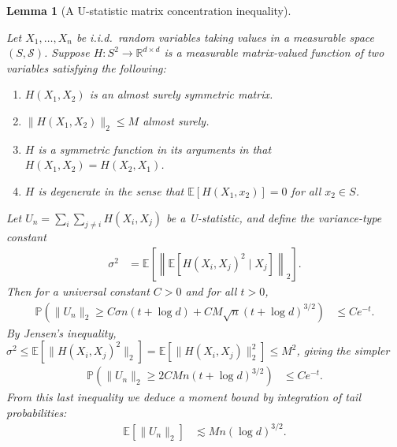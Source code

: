 \documentclass[11pt,lof]{puthesis}
\renewcommand{\P}{\ensuremath{\mathbb{P}}}
\newcommand{\R}{\ensuremath{\mathbb{R}}}
\newcommand{\E}{\ensuremath{\mathbb{E}}}
\newcommand{\cS}{\ensuremath{\mathcal{S}}}
\theoremstyle{break}
\newtheorem{lemma}{Lemma}[section]
\theoremstyle{proof}
\begin{document}
\begin{lemma}[A U-statistic matrix concentration inequality]
  \label{lem:kernel_app_ustat_matrix_concentration}

  Let $X_1, \ldots, X_n$ be i.i.d.\ random variables
  taking values in a measurable space $(S, \cS)$.
  Suppose
  $H: S^2 \to \R^{d \times d}$
  is a measurable matrix-valued function
  of two variables
  satisfying the following:
  \begin{enumerate}[label=(\roman*)]

    \item
      $H(X_1, X_2)$ is an almost surely symmetric matrix.

    \item
      $\|H(X_1, X_2)\|_2 \leq M$ almost surely.

    \item
      $H$ is a symmetric function in its arguments in that
      $H(X_1, X_2) = H(X_2, X_1)$.

    \item
      $H$ is degenerate in the sense that
      $\E[H(X_1, x_2)] = 0$ for all $x_2 \in S$.

  \end{enumerate}
  Let $U_n = \sum_i \sum_{j \neq i} H(X_i, X_j)$
  be a U-statistic,
  and define the variance-type constant
  \begin{align*}
    \sigma^2
    &=
    \E\left[
      \left\|
        \E\left[
          H(X_i, X_j)^2
          \mid X_j
        \right]
      \right\|_2
    \right].
  \end{align*}
  Then for a universal constant $C > 0$
  and for all $t > 0$,
  \begin{align*}
    \P\left(
      \|U_n\|_2
      \geq
      C \sigma n (t + \log d)
      + C M \sqrt{n} (t + \log d)^{3/2}
    \right)
    &\leq
    C e^{-t}.
  \end{align*}
  By Jensen's inequality,
  $\sigma^2 \leq \E[ \| H(X_i, X_j)^2 \|_2 ]
  = \E[ \| H(X_i, X_j) \|_2^2 ] \leq M^2$, giving the simpler
  \begin{align*}
    \P\left(
      \|U_n\|_2
      \geq
      2 C M n
      (t + \log d)^{3/2}
    \right)
    &\leq
    C e^{-t}.
  \end{align*}
  From this last inequality we deduce a moment bound
  by integration of tail probabilities:
  \begin{align*}
    \E\left[
      \|U_n\|_2
    \right]
    &\lesssim
    M n (\log d)^{3/2}.
  \end{align*}

\end{lemma}
\end{document}
